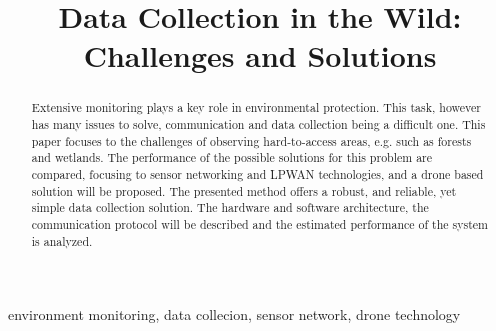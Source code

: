 \documentclass[conference]{IEEEtran}
\begin{document}
\title{Data Collection in the Wild: Challenges and Solutions}

\author{
\and
{}
\and
{}
}


\maketitle

\begin{abstract}

Extensive monitoring plays a key role in environmental protection. This task, however
has many issues to solve, communication and data collection being a difficult one.
This paper focuses to the challenges of observing hard-to-access areas, e.g.
such as forests and wetlands. The performance of the possible solutions for this problem
are compared, focusing to sensor networking and LPWAN technologies, and a drone based solution
will be proposed. The presented method offers a robust, and reliable, yet simple
data collection solution. The hardware and software architecture, the communication protocol
will be described and the estimated performance of the system is analyzed.


\end{abstract}

\begin{IEEEkeywords}
environment monitoring, data collecion, sensor network, drone technology
\end{IEEEkeywords}
\end{document}
